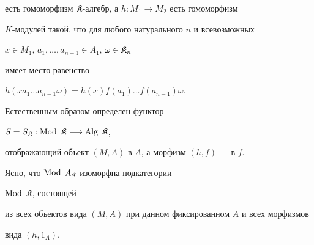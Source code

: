 есть гомоморфизм $\frak K$-алгебр, а $h:M_1\to M_2$ есть гомоморфизм


$K$-модулей такой, что для любого натурального $n$ и всевозможных


$x\in M_1$, $a_1,\dotsc,a_{n-1}\in A_1$, $\omega\in\frak K_n$


имеет место равенство


$h(x a_1 \dotsc a_{n-1} \omega)=h(x) f(a_1) \dotsc f(a_{n-1}) \omega$.


Естественным образом определен функтор


$S=S_{\frak K}: \operatorname{Mod}$-$\frak K \longrightarrow\operatorname{Alg}$-$\frak K$,


отображающий объект $(M,A)$ в $A$, а морфизм $(h,f)$ --- в $f$.


Ясно, что $\operatorname{Mod}$-$A_{\frak K}$ изоморфна подкатегории


$\operatorname{Mod}$-$\frak K$, состоящей


из всех объектов вида $(M,A)$ при данном фиксированном $A$ и всех морфизмов


вида $(h,1_A)$.





